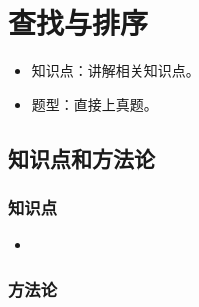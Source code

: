 
\chapter{查找与排序}
\label{chap13}

\begin{itemize}[noitemsep,topsep=0pt,parsep=0pt,partopsep=0pt]
	\item 知识点：讲解相关知识点。
	\item 题型：直接上真题。
\end{itemize}

\section{知识点和方法论}

\subsection{知识点}
\begin{itemize}[noitemsep,topsep=0pt,parsep=0pt,partopsep=0pt]
	\item 
\end{itemize}

\subsection{方法论}